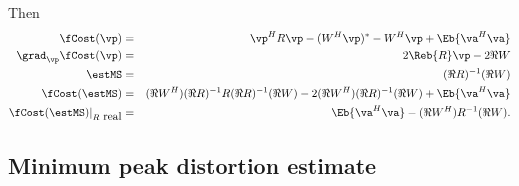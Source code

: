 Then
\begin{eqnarray*}
   \fCost(\vp)           &=& \vp^H R \vp - (W^H\vp)^\ast -W^H\vp + \Eb{\va^H\va} \\
   \grad_\vp \fCost(\vp) &=& 2\Reb{R}\vp - 2\Re{W}  \\
   \estMS                  &=& (\Re{R})^{-1}(\Re{W})  \\
   \fCost(\estMS)        &=&    (\Re{W^H})(\Re{R})^{-1} R (\Re{R})^{-1}(\Re{W}) - 2(\Re{W^H})(\Re{R})^{-1}(\Re{W}) + \Eb{\va^H\va} \\
   \fCost(\estMS)|_{R\mbox{ real}} &=&    \Eb{\va^H\va} - (\Re{W^H})R^{-1}(\Re{W}).
\end{eqnarray*}



\subsection{Minimum peak distortion estimate}
\label{sec:eq_pd}
